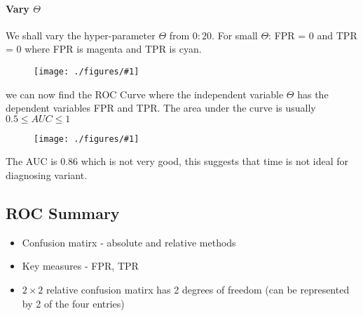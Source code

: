 \documentclass[12pt]{book}
\newcommand{\incimg}[2]{%
       \begin{figure}[h]
               \centering
               \texttt{[image: ./figures/\#1]}
       \end{figure}
}
\begin{document}
\paragraph{Vary $\Theta$}
We shall vary the hyper-parameter $\Theta$ from $0:20$. For small $\Theta$: FPR = 0 and TPR = 0
where FPR is magenta and TPR is cyan.
\incimg{fprtpr}{0.5}

we can now find the ROC Curve where the independent variable $\Theta$ has the dependent
variables FPR and TPR. The area under the curve is usually $0.5 \leq AUC \leq 1$
\incimg{ROCCurve}{0.4}

The AUC is 0.86 which is not very good, this suggests that time is not ideal for 
diagnosing variant.

\subsection*{ROC Summary}
\begin{itemize}
        \item Confusion matirx - absolute and relative methods
        \item Key measures - FPR, TPR
        \item $2 \times 2$ relative confusion matirx has 2 degrees of freedom (can be represented 
                by 2 of the four entries)
\end{itemize}
\end{document}
